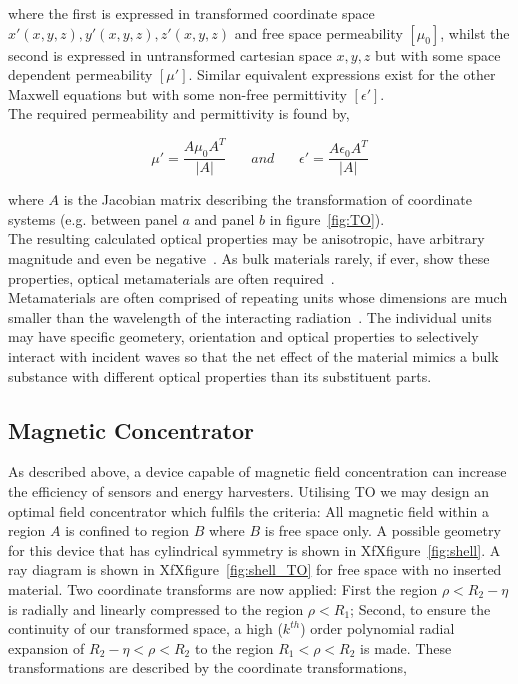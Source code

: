 \documentclass[11pt]{iopart}
\begin{document}
where the first is expressed in transformed coordinate space $x'(x, y,
z), y'(x, y, z), z'(x, y, z)$ and free space permeability $[\mu_0]$,
whilst the second is expressed in untransformed cartesian space $x, y,
z$ but with some space dependent permeability $[\mu']$. Similar
equivalent expressions exist for the other Maxwell equations but with
some non-free permittivity $[\epsilon']$.\\
The required permeability and permittivity is found by,

\begin{equation}
  \label{eqn:J}
  \mu'=\frac{A\mu_0 A^T}{|A|}
  ~~~~~~~~and~~~~~~~~
  \epsilon'=\frac{A\epsilon_0 A^T}{|A|}
\end{equation}

where $A$ is the Jacobian matrix describing the transformation of
coordinate systems (e.g. between panel $a$ and panel $b$ in
figure~\ref{fig:TO}). \\
The resulting calculated optical properties may be anisotropic, have
arbitrary magnitude and even be negative~\cite{}. As bulk materials rarely, if
ever, show these properties, optical metamaterials are often
required~\cite{META3}. \\
Metamaterials are often comprised of repeating units whose dimensions
are much smaller than the wavelength of the interacting
radiation~\cite{META2}. The individual units may have specific
geometery, orientation and optical properties to selectively interact
with incident waves so that the net effect of the material mimics a bulk
substance with different optical properties than its substituent
parts.\\

\subsection{Magnetic Concentrator}
As described above, a device capable of magnetic field concentration
can increase the efficiency of sensors and energy harvesters.
Utilising TO we may design an optimal field concentrator which fulfils
the criteria: All magnetic field within a region $A$ is confined to
region $B$ where $B$ is free space only. A possible geometry for this
device that has cylindrical symmetry is shown in
XfXfigure~\ref{fig:shell}. A ray diagram
is shown in XfXfigure~\ref{fig:shell_TO} for free space with no
inserted material. Two coordinate transforms are now applied: First
the region $\rho < R_2 - \eta$ is radially and linearly compressed to
the region $\rho < R_1$; Second, to ensure the continuity of our
transformed space, a high ($k^{th}$) order polynomial radial expansion
of $R_2 - \eta < \rho < R_2$ to the region $R_1 < \rho < R_2$ is
made. These transformations are described by the coordinate
transformations,
\end{document}
